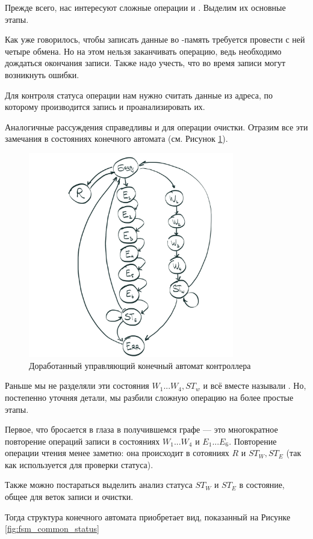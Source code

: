 \par{Прежде всего, нас интересуют сложные операции  и . Выделим их основные этапы.}

\par{Как уже говорилось, чтобы записать данные во -память требуется провести с ней четыре обмена. Но на этом нельзя заканчивать операцию, ведь необходимо дождаться окончания записи. Также надо учесть, что во время записи могут возникнуть ошибки.}
\par{Для контроля статуса операции нам нужно считать данные из адреса, по которому производится запись и проанализировать их.}
\par{Аналогичные рассуждения справедливы и для операции очистки. Отразим все эти замечания в состояниях конечного автомата (см. Рисунок \ref{fig:fsm_extended}).}

\begin{figure}[H]
\centering
% 
\includegraphics[width=0.8\textwidth]{images/lab_6/fsm_extended}
\caption{Доработанный управляющий конечный автомат контроллера }
\label{fig:fsm_extended}
\end{figure}

\par{Раньше мы не разделяли эти состояния $W_1 ... W_4, ST_w$ и всё вместе называли . Но, постепенно уточняя детали, мы разбили сложную операцию на более простые этапы.}
\par{Первое, что бросается в глаза в получившемся графе --- это многократное повторение операций записи в состояниях $W_1 ... W_4$ и $E_1 ... E_6$. Повторение операции чтения менее заметно: она происходит в сотояниях $R$ и $ST_W, ST_E$ (так как используется для проверки статуса).}
\par{Также можно постараться выделить анализ статуса $ST_W$ и $ST_E$ в состояние, общее для веток записи и очистки.}
\par{Тогда структура конечного автомата приобретает вид, показанный на Рисунке \ref{fig:fsm_common_status}}


